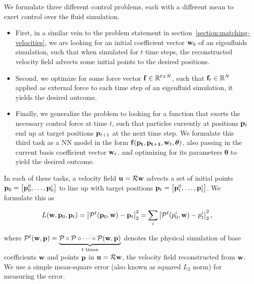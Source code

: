 We formulate three different control problems, each with a different mean to
exert control over the fluid simulation.
\begin{itemize}
  \item First, in a similar vein to the problem statement in
    section~\ref{section:matching-velocities}, we are looking for an initial
    coefficient vector $\vb{w}_0$ of an eigenfluids simulation, such that when
    simulated for $t$ time steps, the reconstructed velocity field advects some
    initial points to the desired positions.
  \item Second, we optimize for some force vector $\vb{f}\in \mathbb{R}^{t\times
    N}$, such that $\vb{f}_t \in \mathbb{R}^N$ applied as external force to each
    time step of an eigenfluid simulation, it yields the desired outcome.
  \item Finally, we generalize the problem to looking for a function that exerts
    the necessary control force at time $t$, such that particles currently at
    positions $\vb{p}_t$ end up at target positions $\vb{p}_{t+1}$ at the
    next time step. We formulate this third task as a \acf{NN} model in the
    form $\vb{f}(\vb{p_t}, \vb{p_{t+1}}, \vb{w}_{t}, \boldsymbol\theta)$, also
    passing in the current basis coefficient vector $\vb{w}_t$, and optimizing
    for its parameters $\boldsymbol\theta$ to yield the desired outcome.
\end{itemize}

In each of these tasks, a velocity field $\vb{u} = \mathcal{R}\vb{w}$ advects
a set of initial points $\vb{p}_0 = \left[\vb{p}_0^0,\dots, \vb{p}_0^i\right]$
to line up with target positions $\vb{p}_t = \left[\vb{p}_t^0, \dots,
\vb{p}_t^i\right]$.  We formulate this as 

\begin{equation}\label{eq:advecting-particles-loss}
  L(\vb{w}, \vb{p}_0, \vb{p}_t)
  = \left| \mathcal{P}^{t}(\vb{p}_0, \vb{w}) - \vb{p}_t\right|_2^2 
  = \sum_{i}\left|\mathcal{P}^{t}(p_0^i, \vb{w}) - p_t^i\right|_2^2, 
\end{equation}

where $\mathcal{P}^t(\vb{w}, \vb{p}) = \underbrace{\mathcal{P} \circ
\mathcal{P}\circ \dots \circ \mathcal{P}(\vb{w}, \vb{p})}_{t \text{ times}}$
denotes the physical simulation of base coefficients $\vb{w}$ and points
$\vb{p}$ in $\vb{u} = \mathcal{R}\vb{w}$, the velocity field reconstructed from
$\vb{w}$.  We use a simple mean-square error (also known as squared $L_2$ norm)
for measuring the error.

